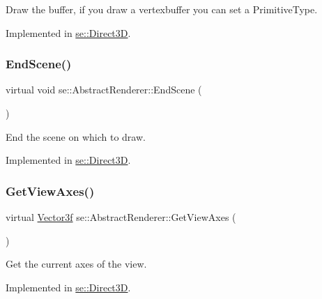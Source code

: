 Draw the buffer, if you draw a vertexbuffer you can set a Primitive\+Type. 

Implemented in \mbox{\hyperlink{classse_1_1_direct3_d_ac6d9e0950a4b58d716aa08b52f79a9ab}{se\+::\+Direct3D}}.

\mbox{\label{classse_1_1_abstract_renderer_a4329c70d64528cdc5bfcd5e6dee3f2e3}} 
\subsubsection{\texorpdfstring{End\+Scene()}{EndScene()}}
{\footnotesize\ttfamily virtual void se\+::\+Abstract\+Renderer\+::\+End\+Scene (\begin{DoxyParamCaption}{ }\end{DoxyParamCaption})\hspace{0.3cm}{\ttfamily [pure virtual]}}

End the scene on which to draw. 

Implemented in \mbox{\hyperlink{classse_1_1_direct3_d_acaa80262dcbd93b7aa03bd61e854b2a2}{se\+::\+Direct3D}}.

\mbox{\label{classse_1_1_abstract_renderer_a8af4c1bef5cf120f6160f5d93dd74207}} 
\subsubsection{\texorpdfstring{Get\+View\+Axes()}{GetViewAxes()}}
{\footnotesize\ttfamily virtual \mbox{\hyperlink{namespacese_a12e07512d95e2fdebdaf74a5ea2cf5f6}{Vector3f}} se\+::\+Abstract\+Renderer\+::\+Get\+View\+Axes (\begin{DoxyParamCaption}{ }\end{DoxyParamCaption})\hspace{0.3cm}{\ttfamily [pure virtual]}}

Get the current axes of the view. 

Implemented in \mbox{\hyperlink{classse_1_1_direct3_d_a74d6926ba18dac6ce23c7dea433de7bd}{se\+::\+Direct3D}}.

\mbox{\label{classse_1_1_abstract_renderer_afd7697df1d4958ec3b0fa13109a269a1}} 

